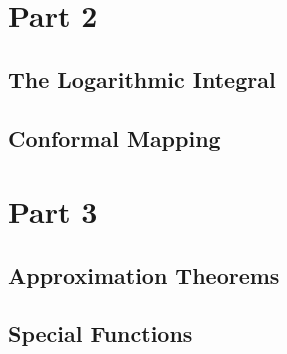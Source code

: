 \documentclass[12pt, a4paper, oneside, openright, titlepage]{book}
\begin{document}
\part{Part 2}

\chapter{The Logarithmic Integral}




\chapter{Conformal Mapping}





\part{Part 3}

\chapter{Approximation Theorems}




\chapter{Special Functions}








\begin{appendices}


\end{appendices}
\end{document}
